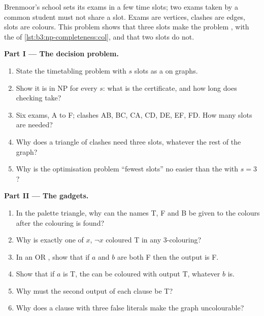 \begin{problem}\label{pb:b3:np-completeness:1}
Brenmoor's school sets its exams in a few time slots; two exams taken by a common student must not share a slot. Exams are vertices, clashes are edges, slots are colours. This problem shows that three slots make the problem , with the  of \cref{lst:b3:np-completeness:col}, and that two slots do not.

\medskip\noindent\textbf{Part I --- The decision problem.}
\begin{enumerate}
  \item State the timetabling problem with $s$ slots as a  on graphs.
  \item Show it is in NP for every $s$: what is the certificate, and how long does checking take?
  \item Six exams, A to F; clashes AB, BC, CA, CD, DE, EF, FD. How many slots are needed?
  \item Why does a triangle of clashes need three slots, whatever the rest of the graph?
  \item Why is the optimisation problem ``fewest slots'' no easier than the  with $s = 3$?
\end{enumerate}

\medskip\noindent\textbf{Part II --- The gadgets.}
\begin{enumerate}[resume]
  \item In the palette triangle, why can the names T, F and B be given to the colours after the colouring is found?
  \item Why is exactly one of $x$, $\neg x$ coloured T in any 3-colouring?
  \item In an OR , show that if $a$ and $b$ are both F then the output is F.
  \item Show that if $a$ is T, the  can be coloured with output T, whatever $b$ is.
  \item Why must the second output of each clause be T?
  \item Why does a clause with three false literals make the graph uncolourable?
\end{enumerate}


\end{problem}
